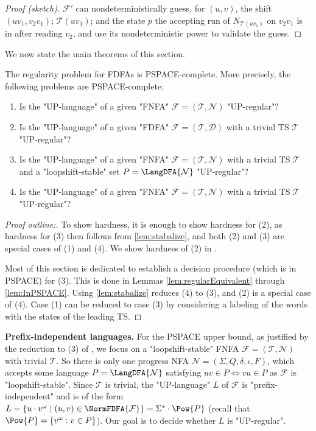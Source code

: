 \documentclass[a4paper,USenglish,cleveref,autoref,thm-restate]{lipics-v2021}
\newcommand{\mc}[1]{\ensuremath{\mathcal{#1}}}
\newcommand{\T}{\mc{T}}
\newcommand{\F}{\mc{F}}
\newcommand{\N}{\mc{N}}
\newcommand{\D}{\mc{D}}
\newcommand{\PSPACE}{\textsf{PSPACE}\xspace}
\begin{document}
\begin{proof}[Proof (sketch)]
  $\F'$ can nondeterministically guess, for $(u,v)$, the shift $(uv_1,v_2v_1)$; $\T(uv_1)$; and the state $p$ the accepting run of $N_{\T(uv_1)}$ on $v_2v_1$ is in after reading $v_2$, and use its nondeterministic power to validate the guess.
\end{proof}

We now state the main theorems of this section.

\begin{theorem}
  \label{thm:regular}
  The regularity problem for FDFAs is \PSPACE-complete. More precisely,
  the following problems are \PSPACE-complete:
  \begin{enumerate}
    \item Is the "UP-language" of a given "FNFA" $\F=(\T,\N)$ "UP-regular"?
    \item Is the "UP-language" of a given "FDFA" $\F=(\T,\D)$ with a trivial TS $\T$ "UP-regular"?
    \item Is the "UP-language" of a given "FNFA" $\F=(\T,\N)$ with a trivial TS $\T$ and a "loopshift-stable" set $P=\LangDFA{\N}$ "UP-regular"?
    \item Is the "UP-language" of a given "FNFA" $\F=(\T,\N)$ with a trivial TS $\T$ "UP-regular"?
  \end{enumerate}
\end{theorem}

\begin{proof}[Proof outline:]
  To show hardness, it is enough to show hardness for (2), as hardness for (3) then follows from \cref{lem:stabalize}, and both (2) and (3) are special cases of (1) and (4). We show hardness of (2) in .

  Most of this section is dedicated to establish a decision procedure (which is in \PSPACE) for (3).
  This is done in Lemmas \ref{lem:regularEquivalent} through \ref{lem:InPSPACE}.
  Using \cref{lem:stabalize} reduces (4) to (3), and (2) is a special case of (4). Case (1) can be reduced to case (3) by considering a labeling of the words with the states of the leading TS.
\end{proof}








\noindent\textbf{Prefix-independent languages.}
For the \PSPACE upper bound, as justified by the reduction to (3) of , we focus on a "loopshift-stable" FNFA $\F = (\T,\N)$ with trivial $\T$. So there is only one progress NFA $\N = (\Sigma, Q, \delta, \iota, F)$, which accepts some language $P = \LangDFA{\N}$ satisfying $uv \in P \Leftrightarrow vu \in P$ as $\F$ is "loopshift-stable".
Since $\T$ is trivial, the "UP-language" $L$ of $\F$ is "prefix-independent" and is of the form $L = \{u\cdot v^\omega \mid (u,v) \in \NormFDFA{\F}\} = \Sigma^* \cdot \Pow{P}$ (recall that $\Pow{P} = \{v^{\omega} : v \in P\}$). Our goal is to decide whether $L$ is "UP-regular".
\end{document}
